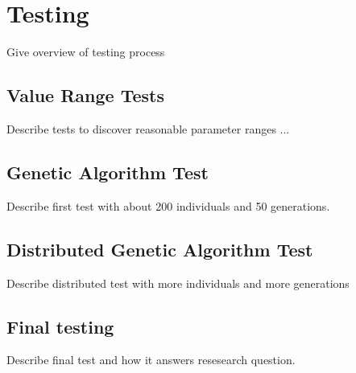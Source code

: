 \section{Testing}
\label{Testing}
Give overview of testing process

\subsection{Value Range Tests}
Describe tests to discover reasonable parameter ranges ...

\subsection{Genetic Algorithm Test}
Describe first test with about 200 individuals and 50 generations.

\subsection{Distributed Genetic Algorithm Test}
Describe distributed test with more individuals and more generations

\subsection{Final testing}
Describe final test and how it answers resesearch question.